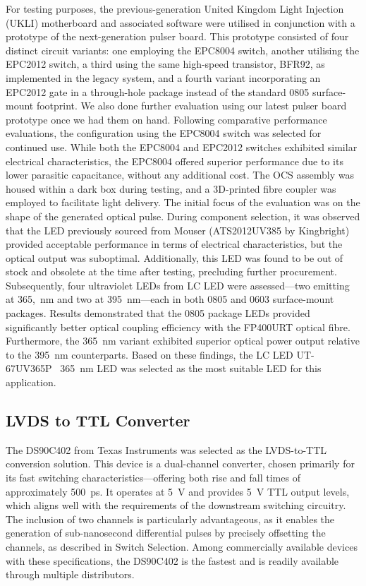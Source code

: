 \documentclass[a4paper,11pt]{article}
\begin{document}
For testing purposes, the previous-generation United Kingdom Light Injection (UKLI) motherboard and associated software were utilised in conjunction with a prototype of the next-generation pulser board. This prototype consisted of four distinct circuit variants: one employing the EPC8004 switch, another utilising the EPC2012 switch, a third using the same high-speed transistor, BFR92, as implemented in the legacy system, and a fourth variant incorporating an EPC2012 gate in a through-hole package instead of the standard 0805 surface-mount footprint. We also done further evaluation using our latest pulser board prototype once we had them on hand.
Following comparative performance evaluations, the configuration using the EPC8004 switch was selected for continued use. While both the EPC8004 and EPC2012 switches exhibited similar electrical characteristics, the EPC8004 offered superior performance due to its lower parasitic capacitance, without any additional cost.
The OCS assembly was housed within a dark box during testing, and a 3D-printed fibre coupler was employed to facilitate light delivery. The initial focus of the evaluation was on the shape of the generated optical pulse.
During component selection, it was observed that the LED previously sourced from Mouser (ATS2012UV385 by Kingbright) provided acceptable performance in terms of electrical characteristics, but the optical output was suboptimal. Additionally, this LED was found to be out of stock and obsolete at the time after testing, precluding further procurement.
Subsequently, four ultraviolet LEDs from LC LED were assessed—two emitting at 365,~nm and two at 395~nm—each in both 0805 and 0603 surface-mount packages. Results demonstrated that the 0805 package LEDs provided significantly better optical coupling efficiency with the FP400URT optical fibre. Furthermore, the 365~nm variant exhibited superior optical power output relative to the 395~nm counterparts.
Based on these findings, the LC LED UT-67UV365P~\cite{ut-67uv365p} 365~nm LED was selected as the most suitable LED for this application.



\subsection{LVDS to TTL Converter}

The DS90C402 \cite{DS90C402} from Texas Instruments was selected as the LVDS-to-TTL conversion solution. This device is a dual-channel converter, chosen primarily for its fast switching characteristics—offering both rise and fall times of approximately 500~ps. It operates at 5~V and provides 5~V TTL output levels, which aligns well with the requirements of the downstream switching circuitry. The inclusion of two channels is particularly advantageous, as it enables the generation of sub-nanosecond differential pulses by precisely offsetting the channels, as described in Switch Selection. Among commercially available devices with these specifications, the DS90C402 is the fastest and is readily available through multiple distributors.
\end{document}
